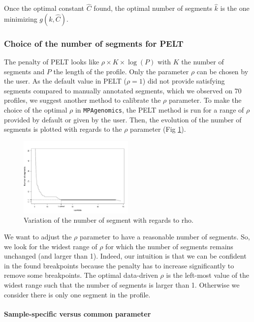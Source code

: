 \documentclass[a4paper,10pt]{article}
\begin{document}
        Once the optimal constant $\hat{C}$ found, the optimal number of segments $\hat{k}$ is the one minimizing $g(k,\hat{C})$.
      
      
      \subsubsection{Choice of the number of segments for PELT}
        \label{sec:calib}
        The penalty of PELT looks like $\rho\times K \times\log(P)$ with $K$ the number of segments and $P$ the length of the profile. Only the parameter $\rho$ can be chosen by the user.
        As the default value in PELT ($\rho=1$) did not provide satisfying segments compared to manually annotated segments, which we observed on 70 profiles, we suggest another method to calibrate the $\rho$ parameter.
        To make the choice of the optimal $\rho$ in \texttt{MPAgenomics}, the PELT method is run for a range of $\rho$ provided by default or given by the user. Then, the evolution of the number of segments is plotted with regards to the $\rho$ parameter (Fig \ref{plateau}). 
  
        \begin{figure}[!h]
		      \centering
		      \includegraphics[width=0.5\textwidth]{fig/plateau}
		      \caption{Variation of the number of segment with regards to rho.}
		      \label{plateau}
	      \end{figure}
	
        We want to adjust the $\rho$ parameter to have a reasonable number of segments. So, we look for the widest range of $\rho$ for which the number of segments remains unchanged (and larger than 1). Indeed, our intuition is that we can be confident in the found breakpoints because the penalty has to increase significantly to remove some breakpoints. The optimal data-driven $\rho$ is the left-most value of the widest range such that the number of segments is larger than 1. Otherwise we consider there is only one segment in the profile.
          
        \paragraph*{Sample-specific versus common parameter}
      
\end{document}
